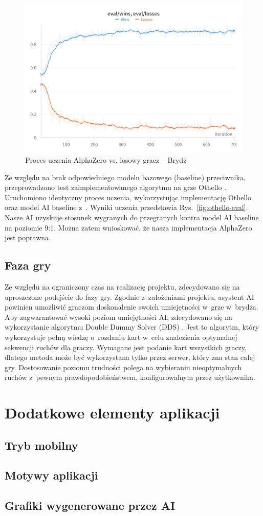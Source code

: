 \begin{figure}[!]
  \centering
  \includegraphics[width=\textwidth]{img/wykresy/bzero-eval.png}
  \caption{Proces uczenia AlphaZero vs. losowy gracz -- Brydż}
  \label{fig:bzero-eval}
\end{figure}

Ze względu na brak odpowiedniego modelu
bazowego (baseline) przeciwnika,
przeprowadzono test zaimplementowanego algorytmu
na grze Othello \cite{Othello}.
Uruchomiono identyczny proces uczenia,
wykorzystując implementację Othello oraz
model AI baseline z~\cite{PGX}.
Wyniki uczenia przedstawia Rys.~\ref{fig:othello-eval}.
Nasze AI uzyskuje stosunek wygranych do przegranych
kontra model AI baseline na poziomie 9:1.
Można zatem wnioskować, że nasza implementacja
AlphaZero jest poprawna.

\FloatBarrier

\subsection{Faza gry}

Ze względu na ograniczony czas na realizację projektu,
zdecydowano się na uproszczone podejście do fazy gry.
Zgodnie z~założeniami projektu, asystent AI powinien umożliwić
graczom doskonalenie swoich umiejętności w~grze w~brydża.
Aby zagwarantować wysoki poziom umiejętności AI, zdecydowano się
na wykorzystanie algorytmu Double Dummy Solver (DDS) \cite{DDS}.
Jest to algorytm, który wykorzystuje pełną wiedzę o~rozdaniu kart
w~celu znalezienia optymalnej sekwencji ruchów dla graczy.
Wymagane jest podanie kart wszystkich graczy, dlatego
metoda może być wykorzystana tylko przez serwer, który zna stan całej gry.
Dostosowanie poziomu trudności polega na wybieraniu nieoptymalnych ruchów
z~pewnym prawdopodobieństwem, konfigurowalnym przez użytkownika.

\section{Dodatkowe elementy aplikacji}

\subsection{Tryb mobilny}

\subsection{Motywy aplikacji}

\subsection{Grafiki wygenerowane przez AI}
